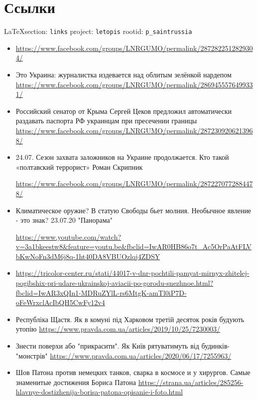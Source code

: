  
 
  
\chapter{Ссылки}
\label{sec:links}
 

\vspace{0.5cm}
{\small\LaTeX section: \verb|links| project: \verb|letopis| rootid: \verb|p_saintrussia|}
\vspace{0.5cm}
  

\begin{itemize}
		\item 
			\url{https://www.facebook.com/groups/LNRGUMO/permalink/2872822512829304/}

		\item Это Украина: журналистка издевается над облитым зелёнкой нардепом
						\url{https://www.facebook.com/groups/LNRGUMO/permalink/2869455576499331/}

		\item Российский сенатор от Крыма Сергей Цеков предложил автоматически
						раздавать паспорта РФ украинцам при пресечении границы
								\url{https://www.facebook.com/groups/LNRGUMO/permalink/2872309206213968/}

		\item 24.07. Сезон захвата заложников на Украине продолжается. Кто такой
						«полтавский террорист» Роман Скрипник

						\url{https://www.facebook.com/groups/LNRGUMO/permalink/2872270772884478/}

		\item Климатическое оружие? В статую Свободы бьет молния. Необычное явление
						- это знак? 23.07.20 "Панорама"

						\url{https://www.youtube.com/watch?v=3a1bkeestw8&feature=youtu.be&fbclid=IwAR0HB86o7t_Ac5OrPaAtFLVbKwNoFn3dM6j8q-1ht40DA8VBUOzlqj4ZDSY}

		\item
						\url{https://tricolor-center.ru/stati/44017-v-dnr-pochtili-pamyat-mirnyx-zhitelej-pogibshix-pri-udare-ukrainskoj-aviacii-po-gorodu-snezhnoe.html?fbclid=IwAR3xQIn1-MDRuZYlL-rs6MtgK-amTl0iP7D-oFeWrxclAcIbQH5CwFy12v4}

		\item Республіка Щастя. Як в комуні під Харковом третій десяток років будують утопію
						\url{https://www.pravda.com.ua/articles/2019/10/25/7230003/}

		\item Знести поверхи або "прикрасити". Як Київ рятуватимуть від будинків-"монстрів"
						\url{https://www.pravda.com.ua/articles/2020/06/17/7255963/}

		\item Шов Патона против немецких танков, сварка в космосе и у хирургов.
						Самые знаменитые достижения Бориса Патона
		\url{https://strana.ua/articles/285256-hlavnye-dostizhenija-borisa-patona-opisanie-i-foto.html}
\end{itemize}

